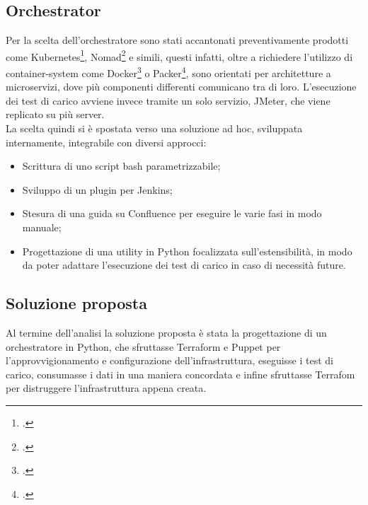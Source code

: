 \subsection{Orchestrator}
Per la scelta dell'orchestratore sono stati accantonati preventivamente prodotti come Kubernetes\footcite{site:kubernetes}, Nomad\footcite{site:nomad} e simili, questi infatti, oltre a richiedere l'utilizzo di \gls{container-system} come Docker\footcite{site:docker} o Packer\footcite{site:packer}, sono orientati per architetture a 	\gls{microservizi}, dove più componenti differenti comunicano tra di loro. L'esecuzione dei test di carico avviene invece tramite un solo servizio, JMeter, che viene replicato su più server. \\
La scelta quindi si è spostata verso una soluzione ad hoc, sviluppata internamente, integrabile con diversi approcci:
\begin{itemize}
	\item Scrittura di uno script bash parametrizzabile;
	\item Sviluppo di un \gls{plugin} per Jenkins;
	\item Stesura di una guida su Confluence per eseguire le varie fasi in modo manuale;
	\item Progettazione di una utility in Python focalizzata sull'estensibilità, in modo da poter adattare l'esecuzione dei test di carico in caso di necessità future.
\end{itemize}
\subsection{Soluzione proposta}
Al termine dell'analisi la soluzione proposta è stata la progettazione di un orchestratore in Python, che sfruttasse Terraform e Puppet per l'approvvigionamento e configurazione dell'infrastruttura, eseguisse i test di carico, consumasse i dati in una maniera concordata e infine sfruttasse Terrafom per distruggere l'infrastruttura appena creata.

